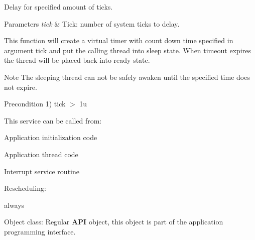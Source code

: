 Delay for specified amount of ticks. 


\begin{DoxyParams}{Parameters}
{\em tick} & Tick\-: number of system ticks to delay.\\
\hline
\end{DoxyParams}
This function will create a virtual timer with count down time specified in argument {\ttfamily tick} and put the calling thread into {\ttfamily sleep} state. When timeout expires the thread will be placed back into {\ttfamily ready} state. \begin{DoxyNote}{Note}
The sleeping thread can not be safely awaken until the specified time does not expire. 
\end{DoxyNote}
\begin{DoxyPrecond}{Precondition}
1) {\ttfamily tick $>$ 1u} 
\end{DoxyPrecond}
\begin{DoxyParagraph}{This service can be called from\-:}

\begin{DoxyItemize}
\item Application initialization code
\item Application thread code
\item Interrupt service routine 
\end{DoxyItemize}
\end{DoxyParagraph}
\begin{DoxyParagraph}{Rescheduling\-:}

\begin{DoxyItemize}
\item always 
\end{DoxyItemize}
\end{DoxyParagraph}
\begin{DoxyParagraph}{Object class\-:}
Regular {\bfseries A\-P\-I} object, this object is part of the application programming interface. 
\end{DoxyParagraph}
